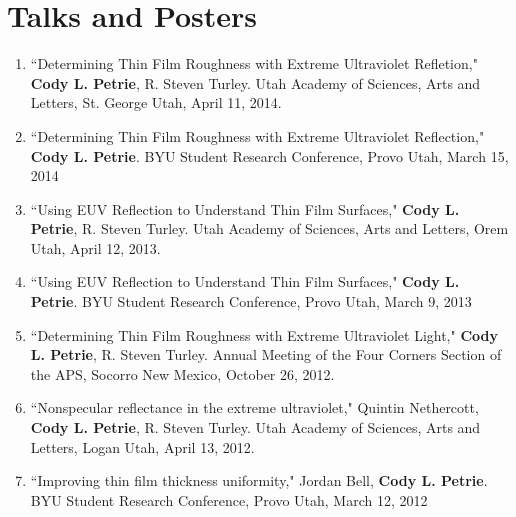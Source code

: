 \documentclass[letterpaper,10pt]{article}
\begin{document}
\section*{Talks and Posters}
\begin{enumerate}
  \item ``Determining Thin Film Roughness with Extreme Ultraviolet Refletion," \textbf{Cody L. Petrie}, R. Steven Turley. Utah Academy of Sciences, Arts and Letters, St. George Utah, April 11, 2014.
  \item ``Determining Thin Film Roughness with Extreme Ultraviolet Reflection," \textbf{Cody L. Petrie}. BYU Student Research Conference, Provo Utah, March 15, 2014
  \item ``Using EUV Reflection to Understand Thin Film Surfaces," \textbf{Cody L. Petrie}, R. Steven Turley. Utah Academy of Sciences, Arts and Letters, Orem Utah, April 12, 2013.
  \item ``Using EUV Reflection to Understand Thin Film Surfaces," \textbf{Cody L. Petrie}. BYU Student Research Conference, Provo Utah, March 9, 2013
  \item ``Determining Thin Film Roughness with Extreme Ultraviolet Light," \textbf{Cody L. Petrie}, R. Steven Turley. Annual Meeting of the Four Corners Section of the APS, Socorro New Mexico, October 26, 2012.
  \item ``Nonspecular reflectance in the extreme ultraviolet," Quintin Nethercott, \textbf{Cody L. Petrie}, R. Steven Turley. Utah Academy of Sciences, Arts and Letters, Logan Utah, April 13, 2012.
  \item ``Improving thin film thickness uniformity," Jordan Bell, \textbf{Cody L. Petrie}. BYU Student Research Conference, Provo Utah, March 12, 2012
\end{enumerate}
\end{document}
